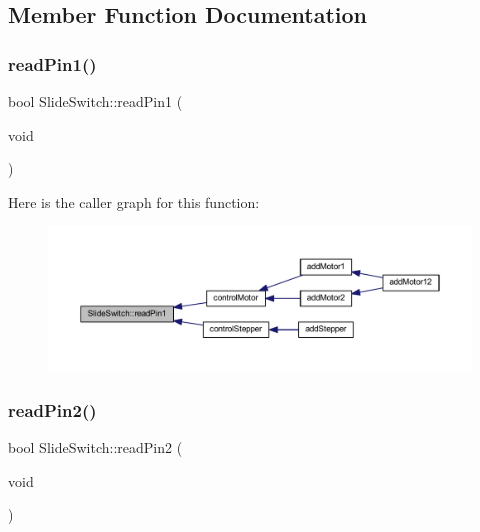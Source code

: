 \subsection{Member Function Documentation}
\mbox{\label{class_slide_switch_a5c9f61ec4369f17e176d948ad74fc3ab}} 
\subsubsection{\texorpdfstring{read\+Pin1()}{readPin1()}}
{\footnotesize\ttfamily bool Slide\+Switch\+::read\+Pin1 (\begin{DoxyParamCaption}\item[{void}]{ }\end{DoxyParamCaption})}

Here is the caller graph for this function\+:
\nopagebreak
\begin{figure}[H]
\begin{center}
\leavevmode
\includegraphics[width=350pt]{d3/d09/class_slide_switch_a5c9f61ec4369f17e176d948ad74fc3ab_icgraph}
\end{center}
\end{figure}
\mbox{\label{class_slide_switch_ada186df3375d7dcd7dac6470c9832830}} 
\subsubsection{\texorpdfstring{read\+Pin2()}{readPin2()}}
{\footnotesize\ttfamily bool Slide\+Switch\+::read\+Pin2 (\begin{DoxyParamCaption}\item[{void}]{ }\end{DoxyParamCaption})}

